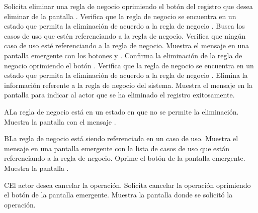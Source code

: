  \begin{UCtrayectoria}
    \UCpaso[\UCactor] Solicita eliminar una regla de negocio oprimiendo el botón \btnEliminar del registro que desea eliminar de la pantalla .
    \UCpaso[\UCsist] Verifica que la regla de negocio se encuentra en un estado que permita la eliminación de acuerdo a la regla de negocio . 
    \UCpaso[\UCsist] Busca los casos de uso que estén referenciando a la regla de negocio.
    \UCpaso[\UCsist] Verifica que ningún caso de uso esté referenciando a la regla de negocio. 
    \UCpaso[\UCsist] Muestra el mensaje  en una pantalla emergente con los botones  y .
    \UCpaso[\UCactor] Confirma la eliminación de la regla de negocio oprimiendo el botón . 
    \UCpaso[\UCsist] Verifica que la regla de negocio se encuentra en un estado que permita la eliminación de acuerdo a la regla de negocio . 
    \UCpaso[\UCsist] Elimina la información referente a la regla de negocio del sistema.
    \UCpaso[\UCsist] Muestra el mensaje  en la pantalla 
    para indicar al actor que se ha eliminado el registro exitosamente.
 \end{UCtrayectoria}
 
 \begin{UCtrayectoriaA}{A}{La regla de negocio está en un estado en que no se permite la eliminación.}
    \UCpaso[\UCsist] Muestra la pantalla  con el mensaje .
 \end{UCtrayectoriaA} 
 \begin{UCtrayectoriaA}{B}{La regla de negocio está siendo referenciada en un caso de uso.}
    \UCpaso[\UCsist] Muestra el mensaje  en una pantalla emergente
    con la lista de casos de uso que están referenciando a la regla de negocio.
    \UCpaso[\UCactor] Oprime el botón  de la pantalla emergente.
    \UCpaso[\UCsist] Muestra la pantalla .
 \end{UCtrayectoriaA}
 \begin{UCtrayectoriaA}{C}{El actor desea cancelar la operación.}
    \UCpaso[\UCactor] Solicita cancelar la operación oprimiendo el botón  de la pantalla emergente.
    \UCpaso[\UCsist] Muestra la pantalla donde se solicitó la operación.
 \end{UCtrayectoriaA} 
